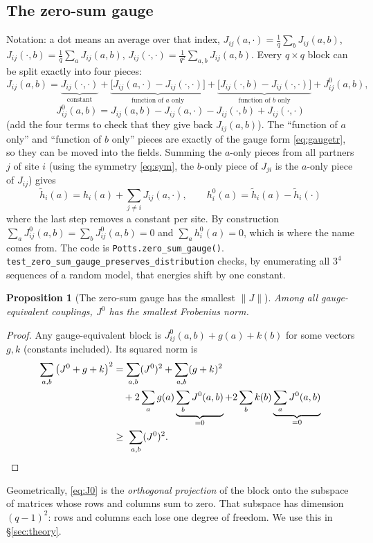 \documentclass[11pt,a4paper]{article}
\newtheorem{prop}{Proposition}
\begin{document}
\subsection{The zero-sum gauge}
Notation: a dot means an average over that index,
$J_{ij}(a,\cdot)=\frac1q\sum_b J_{ij}(a,b)$, $J_{ij}(\cdot,b)=\frac1q\sum_a J_{ij}(a,b)$,
$J_{ij}(\cdot,\cdot)=\frac1{q^2}\sum_{a,b}J_{ij}(a,b)$.
Every $q\times q$ block can be split exactly into four pieces:
\[
J_{ij}(a,b) = \underbrace{J_{ij}(\cdot,\cdot)}_{\text{constant}}
 + \underbrace{\big[J_{ij}(a,\cdot)-J_{ij}(\cdot,\cdot)\big]}_{\text{function of $a$ only}}
 + \underbrace{\big[J_{ij}(\cdot,b)-J_{ij}(\cdot,\cdot)\big]}_{\text{function of $b$ only}}
 + J^0_{ij}(a,b),
\]
\begin{equation}\label{eq:J0}
\boxed{\;J^0_{ij}(a,b) = J_{ij}(a,b) - J_{ij}(a,\cdot) - J_{ij}(\cdot,b) + J_{ij}(\cdot,\cdot)\;}
\end{equation}
(add the four terms to check that they give back $J_{ij}(a,b)$). The ``function of $a$ only'' and
``function of $b$ only'' pieces are exactly of the gauge form \eqref{eq:gaugetr}, so they can be
moved into the fields. Summing the $a$-only pieces from all partners $j$ of site $i$
(using the symmetry \eqref{eq:sym}, the $b$-only piece of $J_{ji}$ is the $a$-only piece of $J_{ij}$) gives
\begin{equation}\label{eq:h0}
\boxed{\;\tilde h_i(a) = h_i(a) + \sum_{j\neq i} J_{ij}(a,\cdot),\qquad h^0_i(a) = \tilde h_i(a) - \tilde h_i(\cdot)\;}
\end{equation}
where the last step removes a constant per site. By construction $\sum_a J^0_{ij}(a,b)=\sum_b
J^0_{ij}(a,b)=0$ and $\sum_a h^0_i(a)=0$, which is where the name comes from. The code is
\texttt{Potts.zero\_sum\_gauge()}. \texttt{test\_zero\_sum\_gauge\_preserves\_distribution}
checks, by enumerating all $3^4$ sequences of a random model, that energies shift by one constant.

\begin{prop}[The zero-sum gauge has the smallest $\|J\|$]
Among all gauge-equivalent couplings, $J^0$ has the smallest Frobenius norm.
\end{prop}
\begin{proof}
Any gauge-equivalent block is $J^0_{ij}(a,b)+g(a)+k(b)$ for some vectors $g,k$ (constants included).
Its squared norm is
\begin{align*}
\sum_{a,b}\big(J^0+g+k\big)^2 &= \sum_{a,b}(J^0)^2 + \sum_{a,b}(g+k)^2\\
 &\quad + 2\sum_a g(a)\underbrace{\sum_bJ^0(a,b)}_{=0} + 2\sum_b k(b)\underbrace{\sum_aJ^0(a,b)}_{=0}\\
 &\ge\;\sum_{a,b}(J^0)^2 .\qedhere
\end{align*}
\end{proof}
Geometrically, \eqref{eq:J0} is the \emph{orthogonal projection} of the block onto the subspace of
matrices whose rows and columns sum to zero. That subspace has dimension $(q-1)^2$: rows and columns
each lose one degree of freedom. We use this in \S\ref{sec:theory}.
\end{document}
